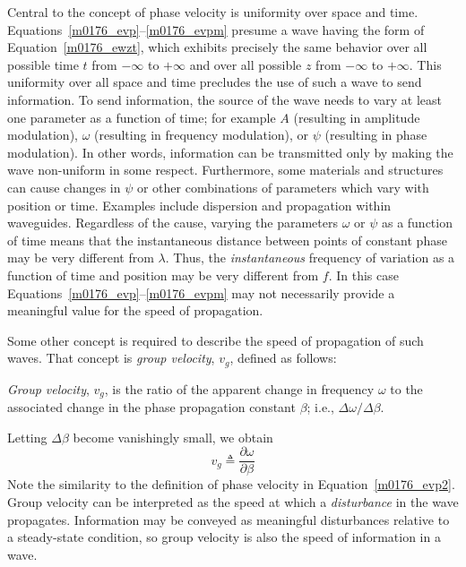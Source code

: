 Central to the concept of phase velocity is uniformity over space and time.
Equations~\ref{m0176_evp}--\ref{m0176_evpm} presume a wave having the form of Equation~\ref{m0176_ewzt}, which exhibits precisely the same behavior over all possible time $t$ from $-\infty$ to $+\infty$ and over all possible $z$ from $-\infty$ to $+\infty$.
This uniformity over all space and time precludes the use of such a wave to send information.
To send information, the source of the wave needs to vary at least one parameter as a function of time; for example 
$A$ (resulting in amplitude modulation), $\omega$ (resulting in frequency modulation), or $\psi$ (resulting in phase modulation).
In other words, information can be transmitted only by making the wave non-uniform in some respect.
Furthermore, some materials and structures can cause changes in $\psi$ or other combinations of parameters which vary with position or time.  
Examples include dispersion
and propagation within waveguides.
Regardless of the cause, varying the parameters $\omega$ or $\psi$ as a function of time means that the instantaneous distance between points of constant phase may be very different from $\lambda$.
Thus, the \emph{instantaneous} frequency of variation as a function of time and position may be very different from $f$.
In this case Equations~\ref{m0176_evp}--\ref{m0176_evpm} may not necessarily provide a meaningful value for the speed of propagation.
   
Some other concept is required to describe the speed of propagation of such waves.
That concept is \emph{group velocity}, $v_g$, defined as follows:
\begin{mdframed}[backgroundcolor=yellow!20,nobreak=true] 
\emph{Group velocity}, $v_g$, is the ratio of the apparent change in frequency $\omega$ to the associated change in the phase propagation constant $\beta$; i.e., $\Delta\omega/\Delta\beta$.
\end{mdframed}
Letting $\Delta\beta$ become vanishingly small, we obtain
%
\begin{equation}
\boxed{
v_g \triangleq \frac{\partial\omega}{\partial\beta}
}
\label{m0176_evg}
\end{equation}
%
Note the similarity to the definition of phase velocity in Equation~\ref{m0176_evp2}.
Group velocity can be interpreted as the speed at which a \emph{disturbance} in the wave propagates.
Information may be conveyed as meaningful disturbances relative to a steady-state condition, so group velocity is also the speed of information in a wave.

